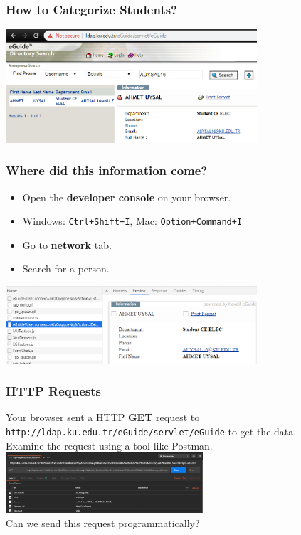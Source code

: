     \begin{frame}
        \frametitle{How to Categorize Students?}
        \includegraphics[width=0.7\textwidth]{images/ldap_auysal16.PNG}
    \end{frame}

    \begin{frame}
        \frametitle{Where did this information come?}
        \LARGE
        \begin{itemize}
            \pause
            \item Open the \textbf{developer console} on your browser.
            \pause
            \item Windows: \texttt{Ctrl+Shift+I}, Mac: \texttt{Option+Command+I}
            \pause
            \item Go to \textbf{network} tab.
            \pause
            \item Search for a person.
        \end{itemize}
        \includegraphics[width=0.7\textwidth]{images/ldap_network.PNG}

    \end{frame}

    \begin{frame}
        \frametitle{HTTP Requests}
        \LARGE
        \pause
        Your browser sent a HTTP \textbf{GET} request to \texttt{http://ldap.ku.edu.tr/eGuide/servlet/eGuide} to get the data.\\
        \pause
        Examine the request using a tool like Postman.\\
        \pause
        \includegraphics[width=0.55\textwidth]{images/postman.PNG}
        \pause
        \\Can we send this request programmatically?
    \end{frame}

